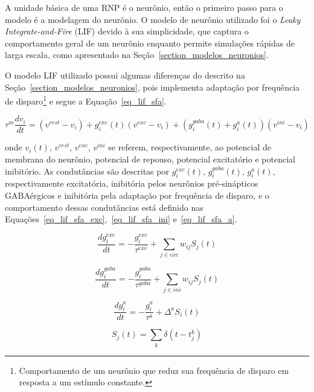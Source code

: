 A unidade básica de uma RNP é o neurônio, então o primeiro passo para o modelo é a modelagem do neurônio. O modelo de neurônio
utilizado foi o \textit{Leaky Integrate-and-Fire} (LIF) devido à sua simplicidade, que captura o comportamento geral de um
neurônio enquanto permite simulações rápidas de larga escala, como apresentado na Seção~\ref{section_modelos_neuronios}.

O modelo LIF utilizado possui algumas diferenças do descrito na Seção~\ref{section_modelos_neuronios}, pois implementa adaptação
por frequência de disparo\footnote{Comportamento de um neurônio que reduz sua frequência de disparo em resposta a um estímulo
constante.} e segue a Equação~\ref{eq_lif_sfa}.

\begin{equation}
\label{eq_lif_sfa}
\tau^m\frac{dv_i}{dt} = (v^{rest} - v_i) + g_i^{exc}(t)(v^{exc} - v_i)+ (g_i^{gaba}(t) + g_i^{a}(t))(v^{ini} - v_i)
\end{equation}

\noindent{}onde $v_i(t)$, $v^{rest}$, $v^{exc}$, $v^{ini}$ se referem, respectivamente, ao potencial de membrana do neurônio,
potencial de repouso, potencial excitatório e potencial inibitório. As condutâncias são descritas por $g_i^{exc}(t)$,
$g_i^{gaba}(t)$, $g_i^{a}(t)$, respectivamente excitatória, inibitória pelos neurônios pré-sinápticos GABAérgicos e inibitória
pela adaptação por frequência de disparo, e o comportamento dessas condutâncias está definido nas
Equações~\ref{eq_lif_sfa_exc},~\ref{eq_lif_sfa_ini} e~\ref{eq_lif_sfa_a}. 

\begin{equation}
\label{eq_lif_sfa_exc}
\frac{dg_i^{exc}}{dt} = -\frac{g_i^{exc}}{\tau^{exc}} + \sum_{j\in exc}{w_{ij}S_j(t)}
\end{equation}

\begin{equation}
\label{eq_lif_sfa_ini}
\frac{dg_i^{gaba}}{dt} = -\frac{g_i^{gaba}}{\tau^{gaba}} + \sum_{j\in ini}{w_{ij}S_j(t)}
\end{equation}

\begin{equation}
\label{eq_lif_sfa_a}
\frac{dg_i^{a}}{dt} = -\frac{g_i^{a}}{\tau^{a}} + \Delta^{a}S_i(t)
\end{equation}

\begin{equation}
\label{eq_lif_sfa_spikes}
S_j(t) = \sum_{k}{\delta(t-t_j^k)}
\end{equation}

